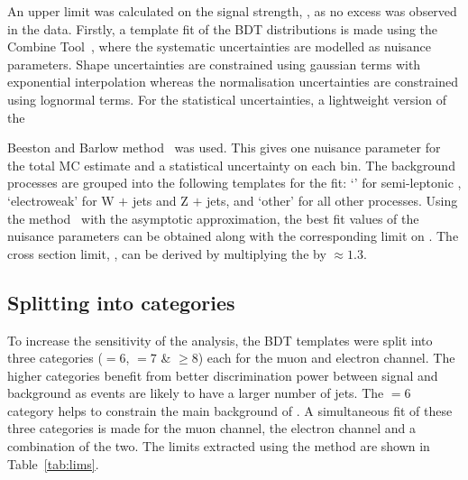 An upper limit was calculated on the signal strength, \signalstrength , as no excess was observed in the data. Firstly, a template fit of the BDT distributions is made using the Combine Tool~\cite{CMS-NOTE-2011-005}, where the systematic uncertainties are modelled as nuisance parameters. Shape uncertainties are constrained using gaussian terms with exponential interpolation whereas the normalisation uncertainties are constrained using lognormal terms. For the statistical uncertainties, a lightweight version of the {Beeston and Barlow method~\cite{Conway:2011in} was used. This gives one nuisance parameter for the total MC estimate and a statistical uncertainty on each bin. The background processes are grouped into the following templates for the fit: `\ttbar' for semi-leptonic \ttbar, `electroweak' for W $+$ jets and Z $+$ jets, and `\ttbar\textunderscore other' for all other \ttbar processes. Using the \CLS method~\cite{Junk1999435,0954-3899-28-10-313} with the asymptotic approximation, the best fit values of the nuisance parameters can be obtained along with the corresponding limit on \signalstrength. The cross section limit, \sigmatttt, can be derived by multiplying the \signalstrength by \sigmattttSM $\approx 1.3$.

\subsection{Splitting into \njets categories}
\label{sec:njetcatlimit}
To increase the sensitivity of the analysis, the BDT templates were split into three \njets categories (\njets $= 6$, \njets $= 7 $ \& \njets $\geq 8$) each for the muon and electron channel. The higher \njets categories benefit from better discrimination power between signal and background as \tttt events are likely to have a larger number of jets. The \njets $= 6$ category helps to constrain the main background of \ttbar. A simultaneous fit of these three \njets categories is made for the muon channel, the electron channel and a combination of the two. The limits extracted using the \CLS method are shown in Table~\ref{tab:lims}.


}
